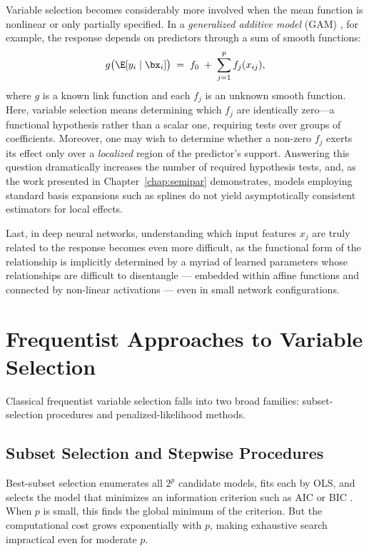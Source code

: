 Variable selection becomes considerably more
involved when the mean function is nonlinear or only partially specified.
In a \emph{generalized additive model} (GAM) \citep{hastie1990gam}, for
example, the response depends on predictors through a sum of smooth
functions:
\begin{equation}
  g\bigl(\E[y_i \mid \bx_i]\bigr)
  \;=\; f_0 \;+\; \sum_{j=1}^{p} f_j(x_{ij}),
  \label{eq:gam}
\end{equation}
where $g$ is a known link function and each $f_j$ is an unknown smooth
function. Here, variable selection means determining which $f_j$ are
identically zero---a functional hypothesis rather than a scalar one, requiring tests over groups of coefficients.  Moreover, one may wish to determine whether a non-zero $f_j$ exerts its effect only over a \emph{localized} region of the predictor's support.  Answering this question dramatically increases the number of required hypothesis tests, and, as the work presented in Chapter~\ref{chap:semipar} demonstrates, models employing standard basis expansions such as splines do not yield asymptotically consistent estimators for local effects.

Last, in deep neural networks, understanding which input
features $x_j$ are truly related to the response becomes even more difficult, as the functional form of the relationship is implicitly determined by a myriad of learned parameters whose relationships are difficult to disentangle --- embedded within affine functions and connected by non-linear activations --- even in small network configurations.  

\section{Frequentist Approaches to Variable Selection}
\label{sec:intro-freq}

Classical frequentist variable selection falls into two broad families:
subset-selection procedures and penalized-likelihood methods.

\subsection{Subset Selection and Stepwise Procedures}
\label{subsec:subset}

Best-subset selection enumerates all $2^p$ candidate models, fits each by
OLS, and selects the model that minimizes an information criterion such as
AIC \citep{akaike1974aic} or BIC \citep{schwarz1978bic}. When $p$ is
small, this finds the global minimum of the criterion. But the
computational cost grows exponentially with $p$, making exhaustive search
impractical even for moderate $p$.

